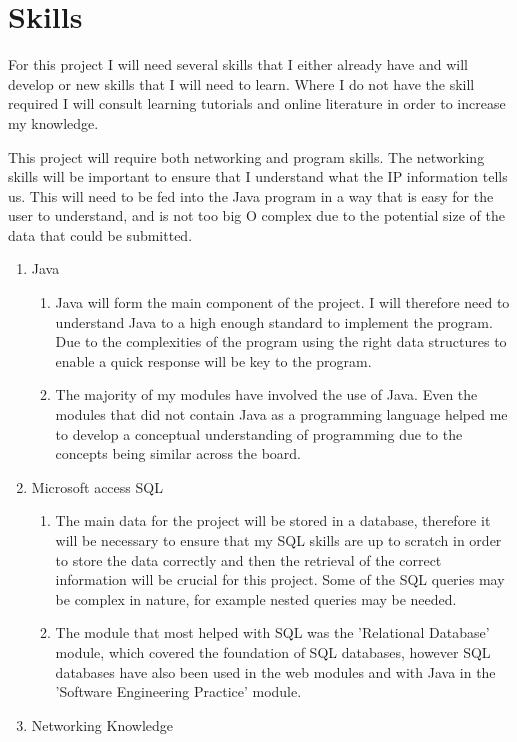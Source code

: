 \section{Skills}
For this project I will need several skills that I either already have and will develop or new skills that I will need to learn. Where I do not have the skill required I will consult learning tutorials and online literature in order to increase my knowledge. 

This project will require both networking and program skills. The networking skills will be important to ensure that I understand what the IP information tells us. This will need to be fed into the Java program in a way that is easy for the user to understand, and is not too big O complex due to the potential size of the data that could be submitted. 
\begin{enumerate}
\item Java 
\begin{enumerate}
    \item Java will form the main component of the project. I will therefore need to understand Java to a high enough standard to implement the program. Due to the complexities of the program using the right data structures to enable a quick response will be key to the program. 
    \item The majority of my modules have involved the use of Java. Even the modules that did not contain Java as a programming language helped me to develop a conceptual understanding of programming due to the concepts being similar across the board.
\end{enumerate}
\item Microsoft access SQL
\begin{enumerate}
    \item The main data for the project will be stored in a database, therefore it will be necessary to ensure that my SQL skills are up to scratch in order to store the data correctly and then the retrieval of the correct information will be crucial for this project. Some of the SQL queries may be complex in nature, for example nested queries may be needed.
    \item The module that most helped with SQL was the 'Relational Database' module, which covered the foundation of SQL databases, however SQL databases have also been used in the web modules and with Java in the 'Software Engineering Practice' module. \end{enumerate}
\item Networking Knowledge

\end{enumerate}
